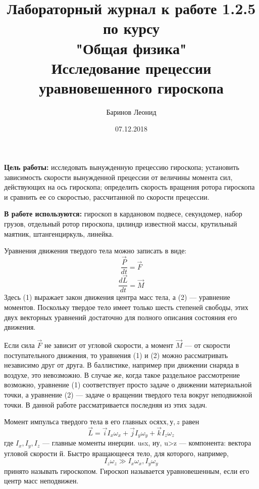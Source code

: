 \documentclass[a4paper,12pt]{article} %
\title{Лабораторный журнал к работе 1.2.5 по курсу \\ "Общая физика"  \\ 
\vspace{0.2cm}
\vspace{4.5cm}
 \LARGE{\textbf{Исследование прецессии уравновешенного гироскопа}}\vspace{5.5cm}}
\date{07.12.2018}
\author{\vspace{0.2cm}Баринов Леонид}
\begin{document}
\maketitle
\newpage
\textbf{Цель работы:} исследовать вынужденную прецессию гироскопа; установить зависимость скорости вынужденной прецессии от величины момента сил, действующих на ось гироскопа; определить скорость вращения ротора гироскопа и сравнить ее со скоростью, рассчитанной по скорости прецессии.

\textbf{В работе используются:} гироскоп в кардановом подвесе, секундомер, набор грузов, отдельный ротор гироскопа, цилиндр известной массы, крутильный маятник, штангенциркуль, линейка.

Уравнения движения твердого тела можно записать в виде:
\begin{equation}
\frac{\overrightarrow{P}}{dt} = \overrightarrow{F}
\end{equation}
\begin{equation}
\frac{d\overrightarrow{L}}{dt} = \overrightarrow{M}
\end{equation}
Здесь (1) выражает закон движения центра масс тела, а (2) — уравнение моментов. Поскольку твердое тело имеет только шесть степеней свободы, этих двух векторных уравнений достаточно для полного описания состояния его движения.

Если сила $\overrightarrow{F}$ не зависит от угловой скорости, а момент $\overrightarrow{M}$ — от скорости поступательного движения, то уравнения (1) и (2) можно рассматривать независимо друг от друга. В баллистике, например при движении снаряда в воздухе, это невозможно. В случае же, когда такое раздельное рассмотрение возможно, уравнение (1) соответствует просто задаче о движении материальной точки, а уравнение (2) — задаче о вращении твердого тела вокруг неподвижной точки. В данной работе рассматривается последняя из этих задач.

Момент импульса твердого тела в его главных осях$ х, у, z$ равен
\begin{equation}
\overrightarrow{L} = \overrightarrow{i}I_x\omega_x+\overrightarrow{j}I_y\omega_y + \overrightarrow{k}I_z\omega_z
\end{equation}
где $I_x, I_y, I_z$ — главные моменты инерции. usx, иу, u>z — компонента: вектора угловой скорости й. Быстро вращающееся тело, для которого, например,
\[I_z\omega_z \gg I_x\omega_x, I_y\omega_y\]
принято называть гироскопом. Гироскоп называется уравновешенным, если его центр масс неподвижен.
\end{document}
